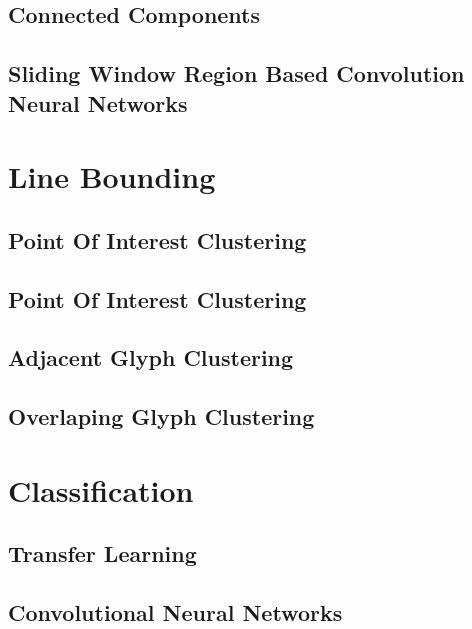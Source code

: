\subsection{Connected Components}

\subsection{Sliding Window Region Based Convolution Neural Networks}


\section{Line Bounding}

\subsection{Point Of Interest Clustering}

\subsection{Point Of Interest Clustering}

\subsection{Adjacent Glyph Clustering}

\subsection{Overlaping Glyph Clustering}


\section{Classification}

\subsection{Transfer Learning}

\subsection{Convolutional Neural Networks}

